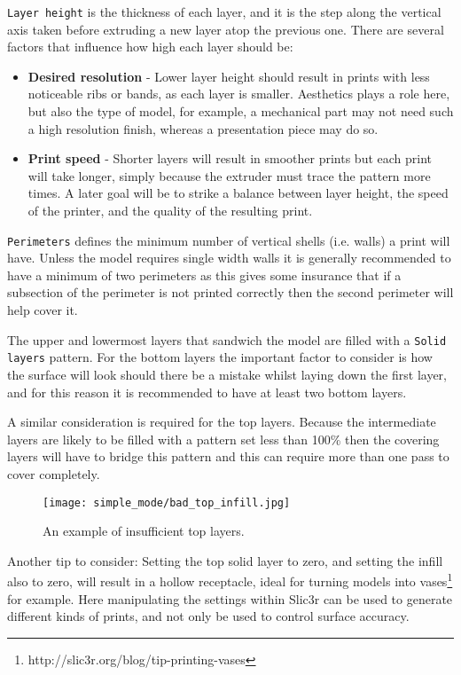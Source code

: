 \texttt{Layer height} is the thickness of each layer, and it is the step along the vertical axis taken before extruding a new layer atop the previous one.  There are several factors that influence how high each layer should be:
\begin{itemize}
	\item \textbf{Desired resolution}  - Lower layer height should result in prints with less noticeable ribs or bands, as each layer is smaller.  Aesthetics plays a role here, but also the type of model, for example, a mechanical part may not need such a high resolution finish, whereas a presentation piece may do so.
	\item \textbf{Print speed}  - Shorter layers will result in smoother prints but each print will take longer, simply because the extruder must trace the pattern more times.  A later goal will be to strike a balance between layer height, the speed of the printer, and the quality of the resulting print.
\end{itemize}
\texttt{Perimeters} defines the minimum number of vertical shells (i.e. walls) a print will have.  Unless the model requires single width walls it is generally recommended to have a minimum of two perimeters as this gives some insurance that if a subsection of the perimeter is not printed correctly then the second perimeter will help cover it.

The upper and lowermost layers that sandwich the model are filled with a \texttt{Solid layers} pattern.  For the bottom layers the important factor to consider is how the surface will look should there be a mistake whilst laying down the first layer, and for this reason it is recommended to have at least two bottom layers.

A similar consideration is required for the top layers.  Because the intermediate layers are likely to be filled with a pattern set less than 100\% then the covering layers will have to bridge this pattern and this can require more than one pass to cover completely.

\begin{figure}[H]
\centering
\texttt{[image: simple\_mode/bad\_top\_infill.jpg]}
\caption{An example of insufficient top layers.}
\label{fig:bad_top_infill}
\end{figure}

Another tip to consider: Setting the top solid layer to zero, and setting the infill also to zero, will result in a hollow receptacle, ideal for turning models into vases\footnote{http://slic3r.org/blog/tip-printing-vases} for example.  Here manipulating the settings within Slic3r can be used to generate different kinds of prints, and not only be used to control surface accuracy.

